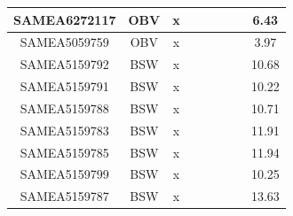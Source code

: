 \documentclass[../main.tex]{subfiles}
\begin{document}
\begin{flushleft}
\begin{footnotesize}
\begin{longtable}{|c|c|c|c|c|c|c|}
    \hline
    SAMEA6272117  & OBV   & x                                                            & ~          & ~                                                                           & ~                                                                 & 6.43      \\ 
    \hline
    SAMEA5059759  & OBV   & x                                                            & ~          & ~                                                                           & ~                                                                 & 3.97      \\ 
    \hline
    SAMEA5159792  & BSW   & x                                                            & ~          & ~                                                                           & ~                                                                 & 10.68     \\ 
    \hline
    SAMEA5159791  & BSW   & x                                                            & ~          & ~                                                                           & ~                                                                 & 10.22     \\ 
    \hline
    SAMEA5159788  & BSW   & x                                                            & ~          & ~                                                                           & ~                                                                 & 10.71     \\ 
    \hline
    SAMEA5159783  & BSW   & x                                                            & ~          & ~                                                                           & ~                                                                 & 11.91     \\ 
    \hline
    SAMEA5159785  & BSW   & x                                                            & ~          & ~                                                                           & ~                                                                 & 11.94     \\ 
    \hline
    SAMEA5159799  & BSW   & x                                                            & ~          & ~                                                                           & ~                                                                 & 10.25     \\ 
    \hline
    SAMEA5159787  & BSW   & x                                                            & ~          & ~                                                                           & ~                                                                 & 13.63     \\ 

\end{longtable}
\end{footnotesize}
\end{flushleft}
\end{document}
